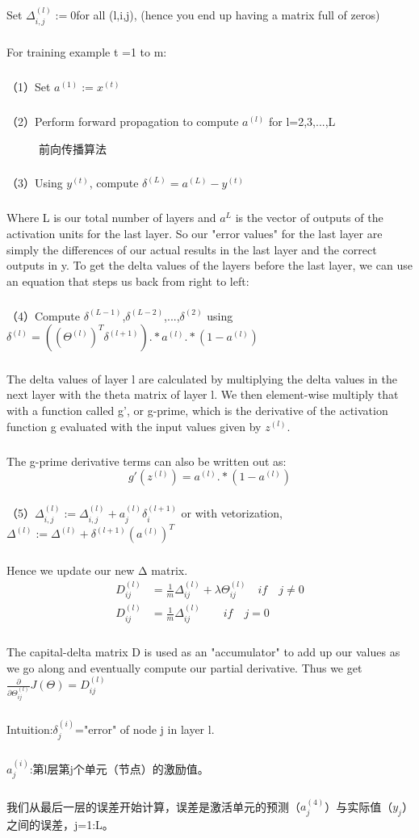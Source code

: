 \documentclass{article}
\begin{document}
\begin{CJK}{UTF8}{gbsn}
\subparagraph{}
Set $\Delta_{i,j}^{(l)}:=0$for all (l,i,j), (hence you end up having a matrix full of zeros)
\subparagraph{}
For training example t =1 to m:
\subparagraph{}
（1）Set $a^{(1)}:=x^{(t)}$
\subparagraph{}
（2）Perform forward propagation to compute $a^{(l)}$ for l=2,3,...,L
\begin{figure}[H]
\caption{前向传播算法}
\label{fig:509}
\end{figure}
\subparagraph{}
（3）Using $y^{(t)}$, compute $\delta^{(L)}=a^{(L)}-y^{(t)}$
\subparagraph{}
Where L is our total number of layers and $a^{L}$ is the vector of outputs of the activation units for the last layer. So our "error values" for the last layer are simply the differences of our actual results in the last layer and the correct outputs in y. To get the delta values of the layers before the last layer, we can use an equation that steps us back from right to left:
\subparagraph{}
（4）Compute $\delta^{(L-1)}$,$\delta^{(L-2)}$,...,$\delta^{(2)}$ using $\delta^{(l)}=((\Theta^{(l)})^T\delta^{(l+1)}).* a^{(l)}.*(1-a^{(l)})$
\subparagraph{}
The delta values of layer l are calculated by multiplying the delta values in the next layer with the theta matrix of layer l. We then element-wise multiply that with a function called g', or g-prime, which is the derivative of the activation function g evaluated with the input values given by $z^{(l)}$.
\subparagraph{}
The g-prime derivative terms can also be written out as:
\begin{equation}
g'(z^{(l)})=a^{(l)}.*(1-a^{(l)})
\end{equation}
\subparagraph{}
（5）$\Delta_{i,j}^{(l)}:=\Delta_{i,j}^{(l)}+a_j^{(l)}\delta_i^{(l+1)}$ or with vetorization,$\Delta^{(l)}:=\Delta^{(l)}+\delta^{(l+1)}(a^{(l)})^T$
\subparagraph{}
Hence we update our new Δ matrix.
\begin{align}
D_{ij}^{(l)} & =\frac{1}{m}\Delta_{ij}^{(l)}+\lambda\Theta_{ij}^{(l)}\quad{if\quad{j\neq0}}\\
D_{ij}^{(l)} & =\frac{1}{m}\Delta_{ij}^{(l)}\qquad{if\quad{j=0}}
\end{align}
\subparagraph{}
The capital-delta matrix D is used as an "accumulator" to add up our values as we go along and eventually compute our partial derivative. Thus we get $\frac{\partial}{\partial\Theta_{ij}^{(l)}}J(\Theta)=D_{ij}^{(l)}$
\subparagraph{}
Intuition:$\delta_j^{(i)}$="error" of node j in layer l.
\subparagraph{}
$a_j^{(i)}$:第l层第j个单元（节点）的激励值。
\subparagraph{}
我们从最后一层的误差开始计算，误差是激活单元的预测（$a_j^{(4)}$）与实际值（$y_j$）之间的误差，j=1:L。

\end{CJK}
\end{document}
